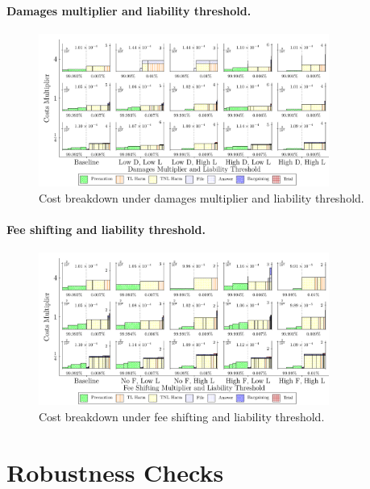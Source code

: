 \documentclass{article}
\begin{document}
\paragraph{Damages multiplier and liability threshold.}
\begin{figure}[ht]
  \centering
  \includegraphics[width=0.85\textwidth]{../Figures/Cost Breakdown Damages Multiplier and Liability Threshold (All Rows).pdf}
  \caption{Cost breakdown under damages multiplier and liability threshold.}
  \label{fig:dm_liability}
\end{figure}

\paragraph{Fee shifting and liability threshold.}
\begin{figure}[ht]
  \centering
  \includegraphics[width=0.85\textwidth]{../Figures/Cost Breakdown Fee Shifting Multiplier and Liability Threshold (All Rows).pdf}
  \caption{Cost breakdown under fee shifting and liability threshold.}
  \label{fig:fee_liability}
\end{figure}



\section{Robustness Checks}
\end{document}
